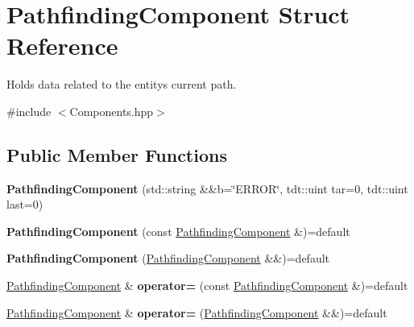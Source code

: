 \hypertarget{struct_pathfinding_component}{}\section{Pathfinding\+Component Struct Reference}
\label{struct_pathfinding_component}


Holds data related to the entity\textquotesingle{}s current path.  




{\ttfamily \#include $<$Components.\+hpp$>$}

\subsection*{Public Member Functions}
\begin{DoxyCompactItemize}
\item 
{\bfseries Pathfinding\+Component} (std\+::string \&\&b=\char`\"{}E\+R\+R\+OR\char`\"{}, tdt\+::uint tar=0, tdt\+::uint last=0)\hypertarget{struct_pathfinding_component_a9be793c07176b14d62be3a1eaf67d12f}{}\label{struct_pathfinding_component_a9be793c07176b14d62be3a1eaf67d12f}

\item 
{\bfseries Pathfinding\+Component} (const \hyperlink{struct_pathfinding_component}{Pathfinding\+Component} \&)=default\hypertarget{struct_pathfinding_component_ac24b51a4f9b35e19fa96ede4ea394fb6}{}\label{struct_pathfinding_component_ac24b51a4f9b35e19fa96ede4ea394fb6}

\item 
{\bfseries Pathfinding\+Component} (\hyperlink{struct_pathfinding_component}{Pathfinding\+Component} \&\&)=default\hypertarget{struct_pathfinding_component_aafbee1831f248a6db84d49c1c482dd4e}{}\label{struct_pathfinding_component_aafbee1831f248a6db84d49c1c482dd4e}

\item 
\hyperlink{struct_pathfinding_component}{Pathfinding\+Component} \& {\bfseries operator=} (const \hyperlink{struct_pathfinding_component}{Pathfinding\+Component} \&)=default\hypertarget{struct_pathfinding_component_a6f4639a658f67253925ab28d3b7b35da}{}\label{struct_pathfinding_component_a6f4639a658f67253925ab28d3b7b35da}

\item 
\hyperlink{struct_pathfinding_component}{Pathfinding\+Component} \& {\bfseries operator=} (\hyperlink{struct_pathfinding_component}{Pathfinding\+Component} \&\&)=default\hypertarget{struct_pathfinding_component_a2c0bda4c5ac1493882bb9bbce141eebb}{}\label{struct_pathfinding_component_a2c0bda4c5ac1493882bb9bbce141eebb}

\end{DoxyCompactItemize}
